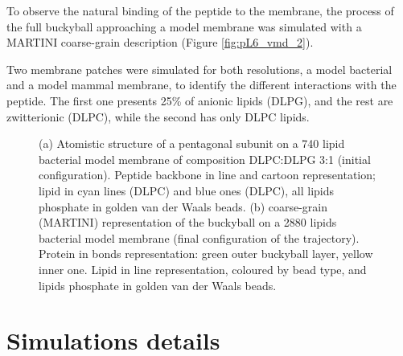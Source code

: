 To observe the natural binding of the peptide to the membrane, the process of the full buckyball approaching a model membrane was simulated with a MARTINI coarse-grain description (Figure \ref{fig:pL6_vmd_2}).

Two membrane patches were simulated for both resolutions, a model bacterial and a model mammal membrane, to identify the different interactions with the peptide. The first one presents 25\% of anionic lipids (DLPG), and the rest are zwitterionic (DLPC), while the second has only DLPC lipids.

\begin{figure}[t]
\centering
{}
\caption[Snapshot of simulations of capzip on model membranes]{(a) Atomistic structure of a pentagonal subunit on a 740 lipid bacterial model membrane of composition DLPC:DLPG 3:1 (initial configuration). Peptide backbone in line and cartoon representation; lipid in cyan lines (DLPC) and blue ones (DLPC), all lipids phosphate in golden van der Waals beads. (b) coarse-grain (MARTINI) representation of the buckyball on a 2880 lipids bacterial model membrane (final configuration of the trajectory). Protein in bonds representation: green outer buckyball layer, yellow inner one. Lipid in line representation, coloured by bead type, and lipids phosphate in golden van der Waals beads.}
\label{fig:pL6_vmd}
\end{figure}


\section{Simulations details} \label{sec:details}

